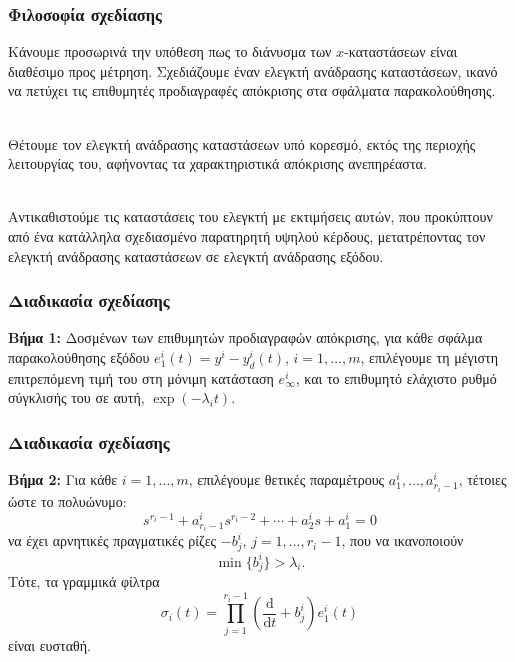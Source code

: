 \documentclass{beamer}
\begin{document}
    \begin{frame}
        \frametitle{Φιλοσοφία σχεδίασης}
        
        Κάνουμε προσωρινά την υπόθεση πως το διάνυσμα των $x$-καταστάσεων είναι διαθέσιμο προς μέτρηση. Σχεδιάζουμε έναν ελεγκτή ανάδρασης καταστάσεων, ικανό να πετύχει τις επιθυμητές προδιαγραφές απόκρισης στα σφάλματα παρακολούθησης.\\~\
        
        \pause
        Θέτουμε τον ελεγκτή ανάδρασης καταστάσεων υπό κορεσμό, εκτός της περιοχής λειτουργίας του, αφήνοντας τα χαρακτηριστικά απόκρισης ανεπηρέαστα.\\~\

        \pause
        Αντικαθιστούμε τις καταστάσεις του ελεγκτή με εκτιμήσεις αυτών, που προκύπτουν από ένα κατάλληλα σχεδιασμένο παρατηρητή υψηλού κέρδους, μετατρέποντας τον ελεγκτή ανάδρασης καταστάσεων σε ελεγκτή ανάδρασης εξόδου.
    
    \end{frame}
 
    \begin{frame}
        \frametitle{Διαδικασία σχεδίασης}
        
        \textbf{Βήμα 1:} Δοσμένων των επιθυμητών προδιαγραφών απόκρισης, για κάθε σφάλμα παρακολούθησης εξόδου $e_1^i(t) = y^i - y_d^i(t)$, $i = 1, \ldots, m$, επιλέγουμε τη μέγιστη επιτρεπόμενη τιμή του στη μόνιμη κατάσταση $e_\infty^i$, και το επιθυμητό ελάχιστο ρυθμό σύγκλισής του σε αυτή, $\exp(-\lambda_i t)$.  
    
    \end{frame}
  
    \begin{frame}
        \frametitle{Διαδικασία σχεδίασης}
    
         \textbf{Βήμα 2:} Για κάθε $i = 1, \ldots, m$, επιλέγουμε θετικές παραμέτρους $a_1^i, \ldots, a_{r_i - 1}^i$, τέτοιες ώστε το πολυώνυμο:
        \begin{equation*}
            s^{r_i - 1} + a_{r_i - 1}^i s^{r_i - 2} + \cdots + a_2^i s + a_1^i = 0 
        \end{equation*}
        να έχει αρνητικές πραγματικές ρίζες $-b_j^i$, $j = 1, \ldots, r_i - 1$, που να ικανοποιούν
        \[
            \min \{b_j^i\} > \lambda_i.
        \]
        \pause
        Τότε, τα γραμμικά φίλτρα
        \[
            \sigma_i(t) = \prod_{j=1}^{r_i - 1}\left( 
            \frac{\mathrm d}{\mathrm dt} + b_j^i \right)e_1^i(t)
        \]
        είναι ευσταθή.
    
    \end{frame}
\end{document}
